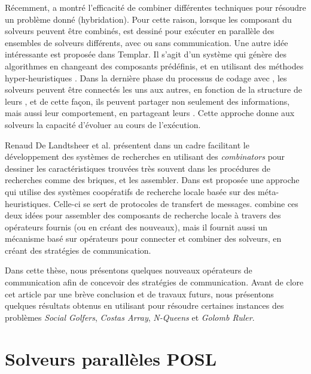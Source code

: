 R\'ecemment, \cite{El-Ghazali2013} a montr\'e l'efficacit\'e de combiner diff\'erentes techniques pour r\'esoudre un probl\`eme donn\'e (hybridation). Pour cette raison, lorsque les composant du solveurs peuvent \^etre combin\'es, \posl{} est dessin\'e pour ex\'ecuter en parall\`ele des ensembles de solveurs diff\'erents, avec ou sans communication. Une autre id\'ee int\'eressante est propos\'ee dans {\sc Templar}. Il s'agit d'un syst\`eme qui g\'en\`ere des algorithmes en changeant des composants pr\'ed\'efinis, et en utilisant des m\'ethodes hyper-heuristiques \cite{Swan2015}. Dans la derni\`ere phase du processus de codage avec \posl{}, les solveurs peuvent \^etre connect\'es les uns aux autres, en fonction de la structure de leurs \opchs, et de cette fa\c{c}on, ils peuvent partager non seulement des informations, mais aussi leur comportement, en partageant leurs \oms. Cette approche donne aux solveurs la capacit\'e d'\'evoluer au cours de l'ex\'ecution.

Renaud De Landtsheer et al. pr\'esentent dans \cite{Landtsheer2015} un cadre facilitant le d\'eveloppement des syst\`emes de recherches en utilisant des \textit{combinators} pour dessiner les caract\'eristiques trouv\'ees tr\`es souvent dans les proc\'edures de recherches comme des briques, et les assembler. Dans \cite{Martin2016} est propos\'ee une approche qui utilise des syst\`emes coop\'eratifs de recherche locale bas\'ee sur des m\'eta-heuristiques. Celle-ci se sert de protocoles de transfert de messages. \posl{} combine ces deux id\'ees pour assembler des composants de recherche locale \`a travers des op\'erateurs fournis (ou en cr\'eant des nouveaux), mais il fournit aussi un m\'ecanisme bas\'e sur op\'erateurs pour connecter et combiner des solveurs, en cr\'eant des strat\'egies de communication.

Dans cette th\`ese, nous pr\'esentons quelques nouveaux op\'erateurs de communication afin de concevoir des strat\'egies de communication. Avant de clore cet article par une br\`eve conclusion et de travaux futurs, nous pr\'esentons quelques r\'esultats obtenus en utilisant \posl{} pour r\'esoudre certaines instances des probl\`emes {\it Social Golfers}, {\it Costas Array}, \textit{N-Queens} et \textit{Golomb Ruler}.

\section{Solveurs parallèles POSL}

